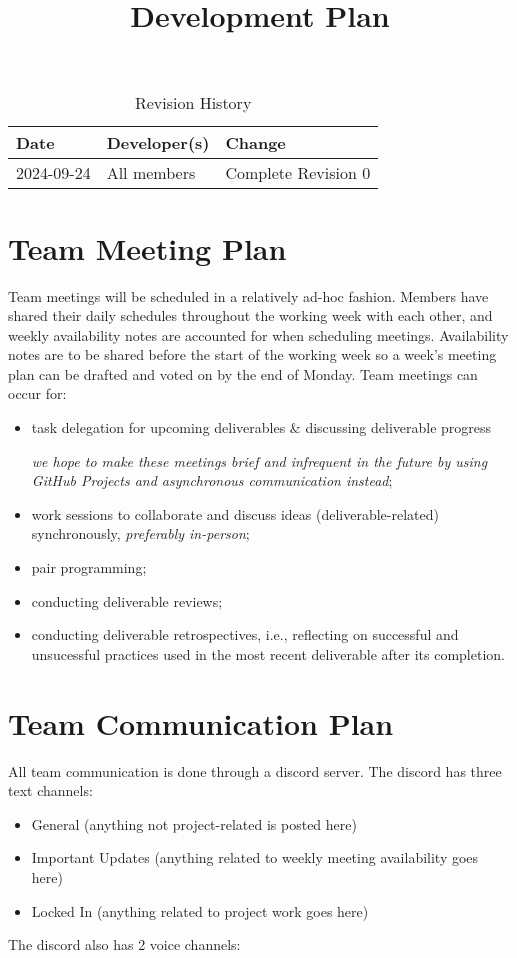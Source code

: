 \documentclass{article}
\title{Development Plan\\\progname}
\author{\authname}
\date{}
\begin{document}
\maketitle

\begin{table}[hp]
\caption{Revision History} \label{TblRevisionHistory}
\begin{tabularx}{\textwidth}{llX}
\toprule
\textbf{Date} & \textbf{Developer(s)} & \textbf{Change}\\
\midrule
2024-09-24 & All members & Complete Revision 0\\
\bottomrule
\end{tabularx}
\end{table}

\section{Team Meeting Plan}
Team meetings will be scheduled in a relatively ad-hoc fashion. Members have shared their daily schedules throughout the working week with each other, and weekly availability notes are accounted for when scheduling meetings. Availability notes are to be shared before the start of the working week so a week's meeting plan can be drafted and voted on by the end of Monday. Team meetings can occur for:
\begin{itemize}
  \item task delegation for upcoming deliverables \& discussing deliverable progress
  
  \emph{we hope to make these meetings brief and infrequent in the future by using GitHub Projects and asynchronous communication instead};
  \item work sessions to collaborate and discuss ideas (deliverable-related) synchronously, \emph{preferably in-person};
  \item pair programming;
  \item conducting deliverable reviews;
  \item conducting deliverable retrospectives, i.e., reflecting on successful and unsucessful practices used in the most recent deliverable after its completion.
\end{itemize}

\section{Team Communication Plan}
All team communication is done through a discord server. The discord has three text
channels:
\begin{itemize}
  \item General (anything not project-related is posted here)
  \item Important Updates (anything related to weekly meeting availability goes here)
  \item Locked In (anything related to project work goes here)
\end{itemize}
\noindent
The discord also has 2 voice channels:
\end{document}
